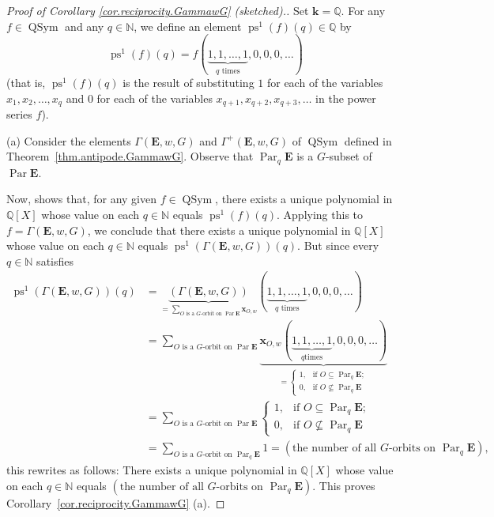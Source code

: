\documentclass[12pt]{article}
\theoremstyle{plain}
\theoremstyle{definition}
\theoremstyle{remark}
\let\sumnonlimits\sum
\renewcommand{\sum}{\sumnonlimits\limits}
\newcommand{\kk}{{\mathbf{k}}}
\newcommand{\xx}{{\mathbf{x}}}
\newcommand{\QSym}{{\operatorname{QSym}}}
\newcommand{\Par}{\operatorname{Par}}
\newcommand{\EE}{{\mathbf{E}}}
\newcommand{\NN}{{\mathbb{N}}}
\newcommand{\QQ}{{\mathbb{Q}}}
\begin{document}
\begin{proof}
[Proof of Corollary \ref{cor.reciprocity.GammawG} (sketched).]
Set $\kk = \QQ$. For any $f \in \QSym$ and any
$q\in \NN $, we define an element $\operatorname{ps}^{1}\left(
f\right)  \left(  q\right)  \in \QQ$ by
\[
\operatorname{ps}^{1}\left(  f\right)  \left(  q\right)  =f\left(
\underbrace{1,1,\ldots,1}_{q\text{ times}},0,0,0,\ldots\right)
\]
(that is, $\operatorname{ps}^{1}\left(  f\right)  \left(  q\right)
$ is the result of substituting $1$ for each of the variables
$x_{1},x_{2},\ldots,x_{q}$ and $0$ for each of the variables
$x_{q+1},x_{q+2},x_{q+3},\ldots$ in the power series $f$).

(a) Consider the elements $\Gamma\left(   \EE ,w,G\right)  $ and
$\Gamma^{+}\left( \EE ,w,G \right)  $ of $\QSym$
defined in Theorem~\ref{thm.antipode.GammawG}. Observe that
$\Par_q \EE$ is a $G$-subset of $\Par \EE$.

Now, \cite[Proposition 7.7 (i)]{Reiner} shows that, for any given
$f\in \QSym $, there exists a unique polynomial in $\mathbb{Q}%
\left[  X\right]  $ whose value on each $q\in \NN $ equals
$\operatorname{ps}^{1}\left(  f\right)  \left(  q\right)  $.
Applying this to $f=\Gamma\left(   \EE ,w,G\right)  $, we conclude that
there exists a unique polynomial in $\mathbb{Q}\left[  X\right]  $ whose value
on each $q\in \NN $ equals $\operatorname{ps}^{1}\left(
\Gamma\left(   \EE ,w,G\right)  \right)  \left(  q\right)  $. But since
every $q\in \NN $ satisfies
\begin{align}
\operatorname{ps}^{1}\left(  \Gamma\left(   \EE ,w,G\right)
\right)  \left(  q\right)   &  =\underbrace{\left(  \Gamma\left( \EE
,w,G\right)  \right)  }_{=\sum_{O\text{ is a }G\text{-orbit on }
\Par \EE } \xx_{O,w}}\left(
\underbrace{1,1,\ldots,1}_{q\text{ times}},0,0,0,\ldots\right) \nonumber\\
&  =\sum_{O\text{ is a }G\text{-orbit on } \Par \EE}
\underbrace{\xx_{O,w}\left(  \underbrace{1,1,\ldots,1}_{q\text{
times}},0,0,0,\ldots\right)  }_{=%
\begin{cases}
1, & \text{if }O\subseteq \Par_q \EE ;\\
0, & \text{if }O\not \subseteq \Par_q \EE
\end{cases}
}\nonumber\\
&  =\sum_{O\text{ is a }G\text{-orbit on } \Par \EE }
\begin{cases}
1, & \text{if }O\subseteq \Par_q \EE ;\\
0, & \text{if }O\not \subseteq \Par_q \EE
\end{cases}
\nonumber\\
& = \sum_{O\text{ is a }G\text{-orbit on } \Par_{q} \EE} 1
=\left(  \text{the number of all }G\text{-orbits on }
\Par_q \EE \right)  ,
\label{pf.cor.reciprocity.GammawG.a.1}
\end{align}
this rewrites as follows: There exists a unique polynomial in $\QQ
\left[  X\right]  $ whose value on each $q\in \NN $ equals $\left(
\text{the number of all }G\text{-orbits on } \Par_q \EE
\right)  $. This proves Corollary~\ref{cor.reciprocity.GammawG} (a).


\end{proof}
\end{document}
